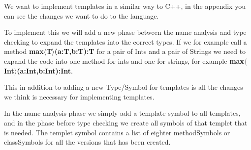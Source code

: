 We want to implement templates in a similar way to C++, in the appendix you can
see the changes we want to do to the language.

To implement this we will add a new phase between the name analysis and type
checking to expand the templates into the correct types. If we for example
call a method \textbf{max$\langle$T$\rangle$(a:T,b:T):T} for a pair of Ints and
a pair of Strings we need to expand the code into one method for ints and one for
strings, for example \textbf{max$\langle$Int$\rangle$(a:Int,b:Int):Int}.

This in addition to adding a new Type/Symbol for templates is all the changes
we think is necessary for implementing templates.

In the name analysis phase we simply add a template symbol to all templates,
and in the phase before type checking we create all symbols of that templet
that is needed. The templet symbol contains a list of eighter methodSymbols or
classSymbols for all the versions that has been created.

\iffalse
The first thing our compiled does is checking whether the code compiles to
the BNF, this is done in two steps by first tokenizing the code into the
tokens found in our language, and then in the parser check whether the order
of the tokens are in complient with our language. We had to add some rules to
the BNF to make room for templates, the addition can be found in the appendix.
In the next part, name analysis we make sure that the code follows a set of rules
and attatch symbols to all identifiers. After the name analysis we run type
checking where we detect and make sure that all expressions produce the correct
type. To make this part work with templates we have to expand all templates
befor we run the type checking, and modify the symbols slighetly.
\fi
